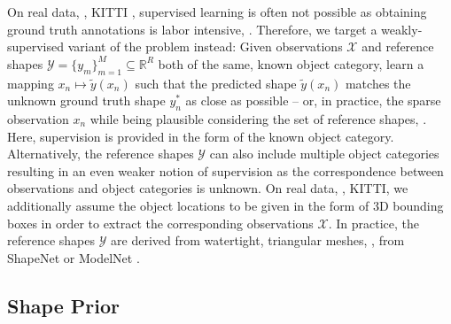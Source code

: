 On real data, \eg, KITTI \citep{Geiger2012CVPR}, supervised learning is often not possible as obtaining ground truth annotations is labor intensive, \cf \citep{Menze2015CVPR,Xie2016CVPR}. Therefore, we target a weakly-supervised variant of the problem instead: Given observations $\mathcal{X}$ and reference shapes $\mathcal{Y} = \{y_m\}_{m = 1}^M \subseteq \mathbb{R}^R$ both of the same, known object category, learn a mapping $x_n \mapsto \tilde{y}(x_n)$ such that the predicted shape $\tilde{y}(x_n)$ matches the unknown ground truth shape $y_n^*$ as close as possible -- or, in practice, the sparse observation $x_n$ while being plausible considering the set of reference shapes, \cf {}. Here, supervision is provided in the form of the known object category. Alternatively, the reference shapes $\mathcal{Y}$ can also include multiple object categories resulting in an even weaker notion of supervision as the correspondence between observations and object categories is unknown. On real data, \eg, KITTI, we additionally assume the object locations to be given in the form of 3D bounding boxes in order to extract the corresponding observations $\mathcal{X}$. In practice, the reference shapes $\mathcal{Y}$ are derived from watertight, triangular meshes, \eg, from ShapeNet \citep{Chang2015ARXIV} or ModelNet \citep{Wu2015CVPR}.

\subsection{Shape Prior}
\label{subsec:method-prior}

